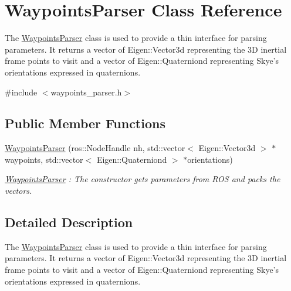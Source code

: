 \hypertarget{class_waypoints_parser}{\section{Waypoints\-Parser Class Reference}
\label{class_waypoints_parser}
}


The \hyperlink{class_waypoints_parser}{Waypoints\-Parser} class is used to provide a thin interface for parsing parameters. It returns a vector of Eigen\-::\-Vector3d representing the 3\-D inertial frame points to visit and a vector of Eigen\-::\-Quaterniond representing Skye's orientations expressed in quaternions.  




{\ttfamily \#include $<$waypoints\-\_\-parser.\-h$>$}

\subsection*{Public Member Functions}
\begin{DoxyCompactItemize}
\item 
\hyperlink{class_waypoints_parser_a7dfcb50264cc966572e536acbb1cf2d6}{Waypoints\-Parser} (ros\-::\-Node\-Handle nh, std\-::vector$<$ Eigen\-::\-Vector3d $>$ $\ast$waypoints, std\-::vector$<$ Eigen\-::\-Quaterniond $>$ $\ast$orientations)
\begin{DoxyCompactList}\small\item\em \hyperlink{class_waypoints_parser}{Waypoints\-Parser} \-: The constructor gets parameters from R\-O\-S and packs the vectors. \end{DoxyCompactList}\end{DoxyCompactItemize}


\subsection{Detailed Description}
The \hyperlink{class_waypoints_parser}{Waypoints\-Parser} class is used to provide a thin interface for parsing parameters. It returns a vector of Eigen\-::\-Vector3d representing the 3\-D inertial frame points to visit and a vector of Eigen\-::\-Quaterniond representing Skye's orientations expressed in quaternions. 

